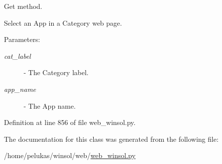 Get method. 

Select an App in a Category web page.

\begin{Desc}
\item[Parameters:]
\begin{description}
\item[{\em cat\_\-label}]- The Category label. \item[{\em app\_\-name}]- The App name. \end{description}
\end{Desc}


Definition at line 856 of file web\_\-winsol.py.

The documentation for this class was generated from the following file:\begin{CompactItemize}
\item 
/home/pelukas/winsol/web/\hyperlink{web__winsol_8py}{web\_\-winsol.py}\end{CompactItemize}
